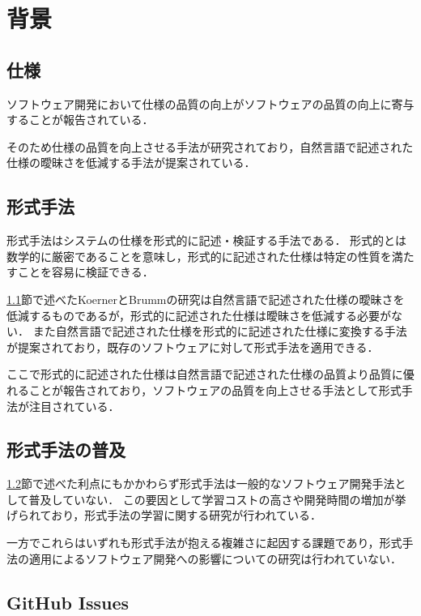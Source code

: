 \documentclass[main]{subfiles}
\begin{document}
\chapter{背景}

\section{仕様}
\label{sec:specification}

ソフトウェア開発において仕様の品質の向上がソフトウェアの品質の向上に寄与することが報告されている\cite{knauss:2009}．

そのため仕様の品質を向上させる手法が研究されており，自然言語で記述された仕様の曖昧さを低減する手法が提案されている\cite{korner:2009}．

\section{形式手法}
\label{sec:formal-method}

形式手法はシステムの仕様を形式的に記述・検証する手法である．
形式的とは数学的に厳密であることを意味し，形式的に記述された仕様は特定の性質を満たすことを容易に検証できる．

\ref{sec:specification}節で述べたKoernerとBrummの研究は自然言語で記述された仕様の曖昧さを低減するものであるが，形式的に記述された仕様は曖昧さを低減する必要がない．
また自然言語で記述された仕様を形式的に記述された仕様に変換する手法が提案されており\cite{ilieva:2005}，既存のソフトウェアに対して形式手法を適用できる．

ここで形式的に記述された仕様は自然言語で記述された仕様の品質より品質に優れることが報告されており\cite{fabbrini:2001}，ソフトウェアの品質を向上させる手法として形式手法が注目されている．%

\section{形式手法の普及}

\ref{sec:formal-method}節で述べた利点にもかかわらず形式手法は一般的なソフトウェア開発手法として普及していない．
この要因として学習コストの高さ\cite{kurita:2011}や開発時間の増加\cite{kitamura:2021}が挙げられており，形式手法の学習に関する研究が行われている\cite{ohnishi:2020,araki:2010,araki:2011}．

一方でこれらはいずれも形式手法が抱える複雑さに起因する課題であり，形式手法の適用によるソフトウェア開発への影響についての研究は行われていない．

\section{GitHub Issues}
\end{document}
